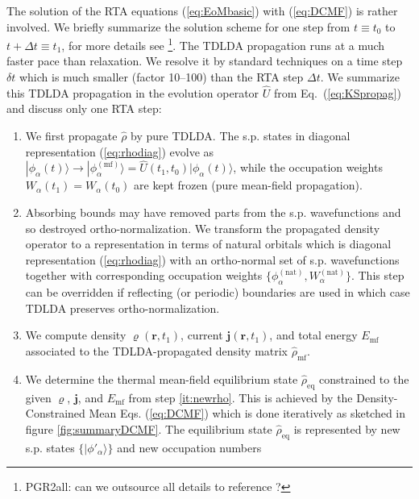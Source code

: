 \documentclass[final,1p]{elsarticle}
\newcommand{\PGRfoot}[1]{{\color{blue}\footnote{\color{blue} #1}}}
\begin{document}
The solution of the RTA equations (\ref{eq:EoMbasic}) with
(\ref{eq:DCMF}) is rather involved. We briefly summarize the solution
scheme for one step from $t\equiv t_0$ to $t\!+\!\Delta t\equiv t_1$,
for more details see \cite{Rei15a}\PGRfoot{PGR2all: can we outsource
  all details to reference \cite{Rei15a}?}.
The TDLDA propagation runs at a much faster pace than relaxation.  We
resolve it by standard techniques \cite{Cal00,Rei04aB} on a time step
$\delta t$ which is much smaller (factor 10--100) than the RTA step
$\Delta t$. We summarize this TDLDA propagation in the evolution
operator $\hat{U}$ from Eq.~(\ref{eq:KSpropag}) and discuss only one
RTA step:
\begin{enumerate}
   \item\label{it:TDLDA} We first propagate $\hat{\rho}$ by pure
     TDLDA.  The s.p. states in diagonal representation
     (\ref{eq:rhodiag}) evolve as $|\phi_\alpha(t)\rangle\rightarrow
     |\phi_\alpha^\mathrm{(mf)}\rangle=\hat{U}(t_1,t_0)|\phi_\alpha(t)\rangle$,
     while the occupation weights $W_\alpha(t_1)=W_\alpha(t_0)$ are
     kept frozen (pure mean-field propagation).
   \item\label{it:natorb} Absorbing bounds may have removed parts from
     the s.p. wavefunctions and so destroyed ortho-normalization.  We
     transform the propagated density operator to a representation in
     terms of natural orbitals which is diagonal representation
     (\ref{eq:rhodiag}) with an ortho-normal set of s.p. wavefunctions
     together with corresponding occupation weights
     $\{\phi_\alpha^\mathrm{(nat)},W_\alpha^\mathrm{(nat)}\}$.  This
     step can be overridden if reflecting (or periodic) boundaries are
     used in which case TDLDA preserves ortho-normalization.
   \item\label{it:newrho} We compute density
     $\varrho(\mathbf{r},t_1)$, current
     $\mathbf{j}(\mathbf{r},t_1)$, and total energy
     $E_\mathrm{mf}$ associated to the TDLDA-propagated density matrix
     $\hat{\rho}_\mathrm{mf}$.
   \item\label{it:DCMF} We determine the thermal mean-field
     equilibrium state $\hat{\rho}_\mathrm{eq}$ constrained to the
     given $\varrho$, $\mathbf{j}$, and $E_\mathrm{mf}$ from step
     \ref{it:newrho}.  This is achieved by the Density-Constrained
     Mean Eqs. (\ref{eq:DCMF}) which is done iteratively as sketched
     in figure \ref{fig:summaryDCMF}.  The equilibrium state
     $\hat{\rho}_\mathrm{eq}$ is represented by new s.p. states
     $\{|\phi'_{\alpha}\rangle\}$ and new occupation numbers

\end{enumerate}
\end{document}
